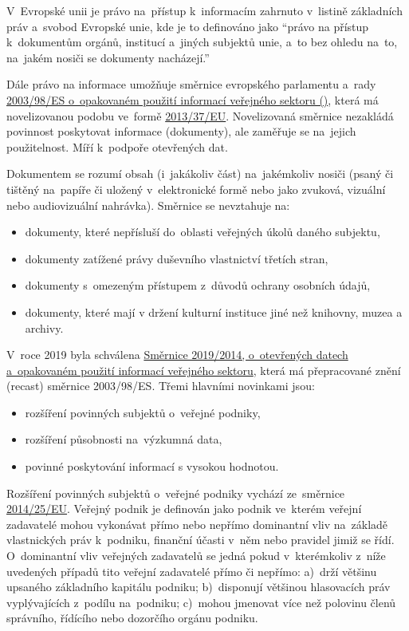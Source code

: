 V~Evropské unii je právo na~přístup k~informacím zahrnuto v~listině základních práv a~svobod Evropské unie, kde je to definováno jako \enquote{právo na přístup k~dokumentům orgánů, institucí a~jiných subjektů unie, a~to bez ohledu na~to, na~jakém nosiči se dokumenty nacházejí.}

Dále právo na informace umožňuje směrnice evropského parlamentu a~rady \href{https://eur-lex.europa.eu/legal-content/CS/TXT/?uri=celex\%3A32003L0098}{2003/98/ES o~opakovaném použití informací veřejného sektoru ()}, která má novelizovanou podobu ve~formě \href{https://eur-lex.europa.eu/legal-content/EN/TXT/?uri=CELEX:02003L0098-20130717}{2013/37/EU}. Novelizovaná směrnice nezakládá povinnost poskytovat informace (dokumenty), ale zaměřuje se na~jejich použitelnost. Míří k~podpoře otevřených dat.

Dokumentem se rozumí obsah (i~jakákoliv část) na~jakémkoliv nosiči (psaný či tištěný na~papíře či uložený v~elektronické formě nebo jako zvuková, vizuální nebo audiovizuální nahrávka). Směrnice se nevztahuje na:

\begin{itemize}
    \item dokumenty, které nepřísluší do~oblasti veřejných úkolů daného subjektu,
    \item dokumenty zatížené právy duševního vlastnictví třetích stran,
    \item dokumenty s~omezeným přístupem z~důvodů ochrany osobních údajů,
    \item dokumenty, které mají v držení kulturní instituce jiné než knihovny, muzea a archivy.
\end{itemize}

V~roce 2019 byla schválena \href{https://eur-lex.europa.eu/legal-content/CS/TXT/?uri=CELEX:32019L1024}{Směrnice 2019/2014, o~otevřených datech a~opakovaném použití informací veřejného sektoru}, která má přepracované znění (recast) směrnice 2003/98/ES. Třemi hlavními novinkami jsou:

\begin{itemize}
    \item rozšíření povinných subjektů o~veřejné podniky,
    \item rozšíření působnosti na~výzkumná data,
    \item povinné poskytování informací s vysokou hodnotou.
\end{itemize}

Rozšíření povinných subjektů o~veřejné podniky vychází ze~směrnice \href{https://eur-lex.europa.eu/legal-content/en/TXT/?uri=CELEX:32014L0025}{2014/25/EU}. Veřejný podnik je definován jako podnik ve~kterém veřejní zadavatelé mohou vykonávat přímo nebo nepřímo dominantní vliv na~základě vlastnických práv k~podniku, finanční účasti v~něm nebo pravidel jimiž se řídí. O~dominantní vliv veřejných zadavatelů se jedná pokud v~kterémkoliv z~níže uvedených případů tito veřejní zadavatelé přímo či nepřímo: a)~drží většinu upsaného základního kapitálu podniku; b)~disponují většinou hlasovacích práv vyplývajících z~podílu na~podniku; c)~mohou jmenovat více než polovinu členů správního, řídícího nebo dozorčího orgánu podniku.

